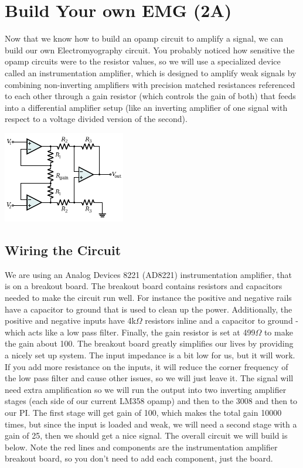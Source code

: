 \chapter{Build Your own EMG (2A)}

Now that we know how to build an opamp circuit to amplify a signal, we can build our own Electromyography circuit.  You probably noticed how sensitive the opamp circuits were to the resistor values, so we will use a specialized device called an instrumentation amplifier, which is designed to amplify weak signals by combining non-inverting amplifiers with precision matched resistances referenced to each other through a gain resistor (which controls the gain of both) that feeds into a differential amplifier setup (like an inverting amplifier of one signal with respect to a voltage divided version of the second).

\includegraphics[width=0.4\textwidth]{../images/400px-Op-Amp_Instrumentation_Amplifier.png}

\section{Wiring the Circuit}

We are using an Analog Devices 8221 (AD8221) instrumentation amplifier, that is on a breakout board.  The breakout board contains resistors and capacitors needed to make the circuit run well.  For instance the positive and negative rails have a capacitor to ground that is used to clean up the power.  Additionally, the positive and negative inputs have 4k$\Omega$ resistors inline and a capacitor to ground - which acts like a low pass filter.  Finally, the gain resistor is set at 499$\Omega$ to make the gain about 100.  The breakout board greatly simplifies our lives by providing a nicely set up system.  The input impedance is a bit low for us, but it will work.  If you add more resistance on the inputs, it will reduce the corner frequency of the low pass filter and cause other issues, so we will just leave it.  The signal will need extra amplification so we will run the output into two inverting amplifier stages (each side of our current LM358 opamp) and then to the 3008 and then to our PI.  The first stage will get gain of 100, which makes the total gain 10000 times, but since the input is loaded and weak, we will need a second stage with a gain of 25, then we should get a nice signal.  The overall circuit we will build is below.  Note the red lines and components are the instrumentation amplifier breakout board, so you don't need to add each component, just the board.

